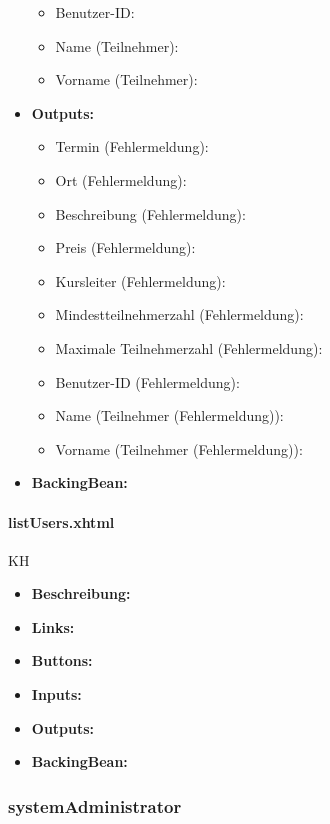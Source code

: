 \begin{itemize}
\begin{itemize}
								\item Benutzer-ID:
								\item Name (Teilnehmer):
								\item Vorname (Teilnehmer):
							\end{itemize}
						\item \textbf{Outputs:}
							\begin{itemize}
								\item Termin (Fehlermeldung):
								\item Ort (Fehlermeldung):
								\item Beschreibung (Fehlermeldung):
								\item Preis (Fehlermeldung):
								\item Kursleiter (Fehlermeldung):
								\item Mindestteilnehmerzahl (Fehlermeldung):
								\item Maximale Teilnehmerzahl (Fehlermeldung):
								\item Benutzer-ID (Fehlermeldung):
								\item Name (Teilnehmer (Fehlermeldung)):
								\item Vorname (Teilnehmer (Fehlermeldung)):
							\end{itemize}
						\item \textbf{BackingBean:}
					\end{itemize}
				
				\paragraph{listUsers.xhtml}
					KH\\
					\begin{itemize}
						\item \textbf{Beschreibung:}
						\item \textbf{Links:}
						\item \textbf{Buttons:}
						\item \textbf{Inputs:}
						\item \textbf{Outputs:}
						\item \textbf{BackingBean:}
					\end{itemize}
			
			\subsubsection{systemAdministrator}
			
